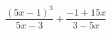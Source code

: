 \begin{ex}[type=expression]
	\begin{condition}
		\( \dfrac{(5x-1)^3}{5x-3}+\dfrac{-1+15x}{3-5x} \)
	\end{condition}
\end{ex}